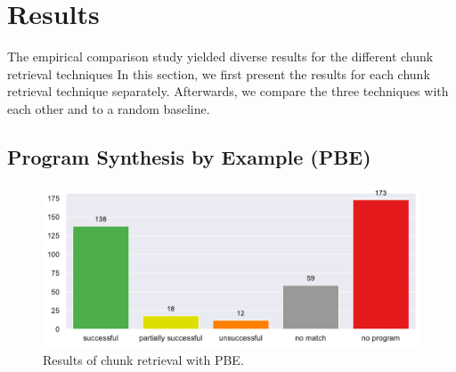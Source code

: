 \section{Results}
The empirical comparison study yielded diverse results for the
different chunk retrieval techniques
In this section, we first present the results for each chunk retrieval
technique separately.
Afterwards, we compare the three techniques with each other and to a
random baseline.

\subsection{Program Synthesis by Example (PBE)}
\label{sec:r:pbe}

\begin{figure}[tbp]
		\centering
		\includegraphics[width=\columnwidth,
		clip]{img/big-study/failure-reason-pbe.pdf}
		\caption{Results of chunk retrieval with PBE.}
		\label{fig:failure-reason-PBE}
\end{figure}

